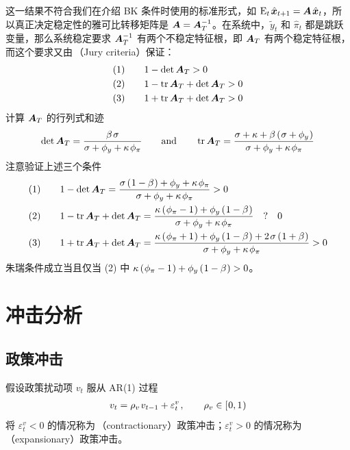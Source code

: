 这一结果不符合我们在介绍 BK 条件时使用的标准形式，如 \(\meant\,\hat{\bsx}\nt=\bsA\,\hat{\bsx}_t\)，所以真正决定稳定性的雅可比转移矩阵是 \(\bm{A}=\bm{A}^{-1}_T\)。在系统中，\(\tilde y_t\) 和 \(\hat \pi_t\) 都是跳跃变量，那么系统稳定要求 \(\bm{A}_T^{-1}\) 有两个不稳定特征根，即 \(\bm{A}_T\) 有两个稳定特征根，而这个要求又由\,（Jury criteria）保证：
\begin{align*}
    (1)\qquad & 1-\det \bm{A}_T>0\\
    (2)\qquad & 1-\operatorname{tr} \bm{A}_T+\det \bm{A}_T>0\\
    (3)\qquad & 1+\operatorname{tr} \bm{A}_T+\det \bm{A}_T>0
\end{align*}
计算 \(\bm{A}_T\) 的行列式和迹
\begin{align*}
    \det \bsA_T=\dfrac{\beta\,\sigma}{\sigma+\phi_y+\kappa\,\phi_\pi}\qquad\n{and}\qquad\tr \bsA_T=\dfrac{\sigma+\kappa+\beta\bka{\sigma+\phi_y}}{\sigma+\phi_y+\kappa\,\phi_\pi}
\end{align*}
注意验证上述三个条件
\begin{align*}
    (1)\qquad & 1-\det \bsA_T=\dfrac{\sigma\bka{1-\beta}+\phi_y+\kappa\,\phi_\pi}{\sigma+\phi_y+\kappa\,\phi_\pi}>0\\
    (2)\qquad & 1-\tr \bsA_T+\det \bsA_T=\dfrac{\kappa\bka{\phi_\pi-1}+\phi_y\bka{1-\beta}}{\sigma+\phi_y+\kappa\,\phi_\pi} \quad ? \quad 0\\
    (3)\qquad & 1+\tr \bsA_T+\det \bsA_T=\dfrac{\kappa\bka{\phi_\pi+1}+\phi_y\bka{1-\beta}+2\,\sigma\bka{1+\beta}}{\sigma+\phi_y+\kappa\,\phi_\pi}>0
\end{align*}
朱瑞条件成立当且仅当 (2) 中 \(\kappa\left(\mspace{1mu}\phi_\pi-1\mspace{1mu}\right)+\phi_y\left(\mspace{1mu}1-\beta\mspace{1mu}\right)>0\)。

\section{冲击分析}

\subsection{政策冲击}

假设政策扰动项 \(v_t\) 服从 AR(1) 过程
\begin{align*}
    v_t=\rho_v\,v\lt+\varepsilon_t^v\,,\qquad\rho_v\in\bksa{0,1}
\end{align*}
将 \(\varepsilon^v_t<0\) 的情况称为\,（contractionary）政策冲击；\(\varepsilon^v_t>0\) 的情况称为\,（expansionary）政策冲击。

